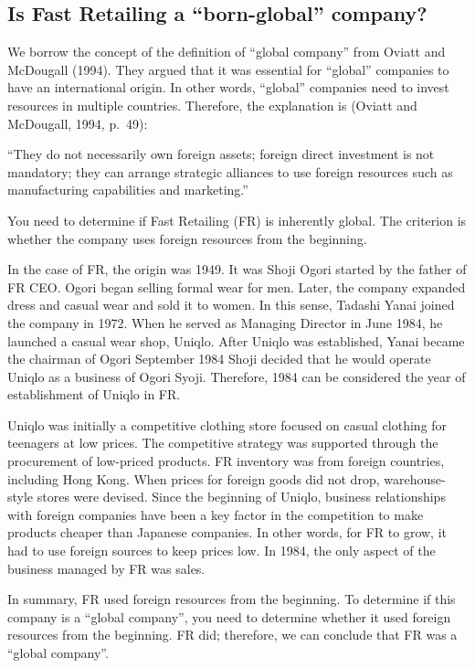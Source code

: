 \documentclass[12pt,a4paper]{article}
\begin{document}
\hypertarget{is-fast-retailing-a-born-global-company}{%
\subsection{Is Fast Retailing a ``born-global''
company?}\label{is-fast-retailing-a-born-global-company}}

We borrow the concept of the definition of ``global company'' from
Oviatt and McDougall (1994). They argued that it was essential for
``global'' companies to have an international origin. In other words,
``global'' companies need to invest resources in multiple countries.
Therefore, the explanation is (Oviatt and McDougall, 1994, p.~49):

``They do not necessarily own foreign assets; foreign direct investment
is not mandatory; they can arrange strategic alliances to use foreign
resources such as manufacturing capabilities and marketing.''

You need to determine if Fast Retailing (FR) is inherently global. The
criterion is whether the company uses foreign resources from the
beginning.

In the case of FR, the origin was 1949. It was Shoji Ogori started by
the father of FR CEO. Ogori began selling formal wear for men. Later,
the company expanded dress and casual wear and sold it to women. In this
sense, Tadashi Yanai joined the company in 1972. When he served as
Managing Director in June 1984, he launched a casual wear shop, Uniqlo.
After Uniqlo was established, Yanai became the chairman of Ogori
September 1984 Shoji decided that he would operate Uniqlo as a business
of Ogori Syoji. Therefore, 1984 can be considered the year of
establishment of Uniqlo in FR.

Uniqlo was initially a competitive clothing store focused on casual
clothing for teenagers at low prices. The competitive strategy was
supported through the procurement of low-priced products. FR inventory
was from foreign countries, including Hong Kong. When prices for foreign
goods did not drop, warehouse-style stores were devised. Since the
beginning of Uniqlo, business relationships with foreign companies have
been a key factor in the competition to make products cheaper than
Japanese companies. In other words, for FR to grow, it had to use
foreign sources to keep prices low. In 1984, the only aspect of the
business managed by FR was sales.

In summary, FR used foreign resources from the beginning. To determine
if this company is a ``global company'', you need to determine whether
it used foreign resources from the beginning. FR did; therefore, we can
conclude that FR was a ``global company''.
\end{document}
